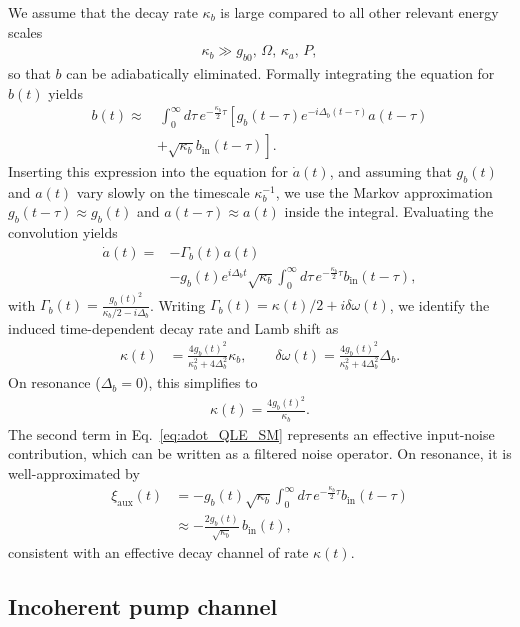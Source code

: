 \documentclass[a4paper,twocolumn,floatfix,10pt,superscriptaddress]%
{quantumarticle}
\begin{document}
We assume that the decay rate $\kappa_b$ is large compared to all other relevant energy scales
\begin{align}
\kappa_b \gg g_{b0},\, \Omega,\, \kappa_a,\, P,
\end{align}
so that $b$ can be adiabatically eliminated. Formally integrating the equation for $b(t)$ yields
\begin{align}
b(t) \approx&\, \int_0^\infty d\tau\, e^{-\frac{\kappa_b}{2} \tau}
\left[ g_b(t - \tau) e^{-i \Delta_b (t - \tau)} a(t - \tau)\right.\nonumber\\
&\left.
+ \sqrt{\kappa_b} b_{\text{in}}(t - \tau) \right].
\end{align}
Inserting this expression into the equation for $\dot{a}(t)$, and assuming that $g_b(t)$ and $a(t)$ vary slowly on the timescale $\kappa_b^{-1}$, we use the Markov approximation
$g_b(t - \tau) \approx g_b(t)$ and $a(t - \tau) \approx a(t)$ inside the integral. Evaluating the convolution yields
\begin{align}
\dot{a}(t)
=& -\Gamma_b(t) a(t)
\label{eq:adot_QLE_SM}\\
&- g_b(t) e^{i \Delta_b t} \sqrt{\kappa_b} \int_0^\infty d\tau\, e^{-\frac{\kappa_b}{2} \tau} b_{\text{in}}(t - \tau),\nonumber
\end{align}
with $\Gamma_b(t)=\frac{g_b(t)^2}{\kappa_b/2 - i \Delta_b}$. Writing $\Gamma_b(t) = \kappa(t)/2 + i\delta\omega(t)$, we identify the induced time-dependent decay rate and Lamb shift as
\begin{align}
\kappa(t) &= \frac{4 g_b(t)^2}{\kappa_b^2 + 4 \Delta_b^2}\kappa_b,\qquad
\delta\omega(t) = \frac{4 g_b(t)^2}{\kappa_b^2 + 4 \Delta_b^2}\Delta_b.
\end{align}
On resonance ($\Delta_b = 0$), this simplifies to
\begin{align}
\kappa(t) = \frac{4 g_b(t)^2}{\kappa_b}.
\end{align}
The second term in Eq.~\eqref{eq:adot_QLE_SM} represents an effective input-noise contribution, which can be written as a filtered noise operator. On resonance, it is well-approximated by
\begin{align}
\xi_{\text{aux}}(t)
&= - g_b(t) \sqrt{\kappa_b} \int_0^\infty d\tau\, e^{-\frac{\kappa_b}{2} \tau} b_{\text{in}}(t - \tau)\nonumber\\
&\approx - \frac{2 g_b(t)}{\sqrt{\kappa_b}}\, b_{\text{in}}(t),
\end{align}
consistent with an effective decay channel of rate $\kappa(t)$.

\subsection{Incoherent pump channel}
\end{document}

